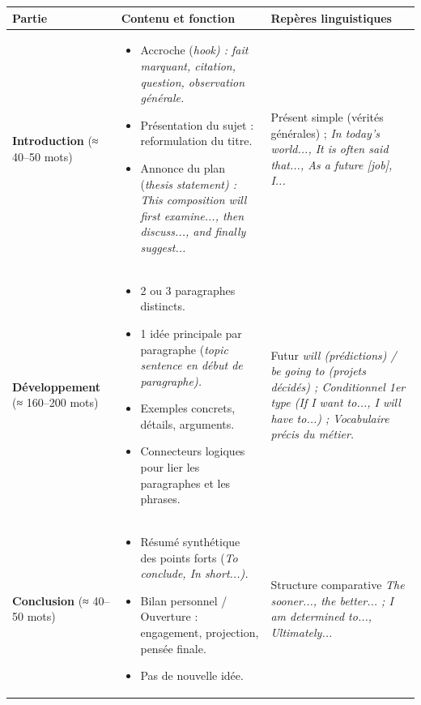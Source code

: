 \documentclass[11pt]{article}
\newcommand{\eng}[1]{\ifmmode\text{\textit{#1}}\else\begingroup\selectlanguage{english}\itshape #1\endgroup\fi}
\begin{document}
\begin{propriete}
\begin{center}
\begin{tabularx}{\linewidth}{|X|X|X|}
\hline
\rowcolor{popblueL} \textbf{Partie} & \textbf{Contenu et fonction} & \textbf{Repères linguistiques} \\
\hline
\textbf{Introduction} (≈ 40–50 mots) & \begin{itemize}\item Accroche (\eng{hook}) : fait marquant, citation, question, observation générale.\item Présentation du sujet : reformulation du titre.\item Annonce du plan (\eng{thesis statement}) : \eng{This composition will first examine..., then discuss..., and finally suggest...}\end{itemize} & Présent simple (vérités générales) ; \eng{In today's world...}, \eng{It is often said that...}, \eng{As a future [job], I...} \\
\hline
\textbf{Développement} (≈ 160–200 mots) & \begin{itemize}\item 2 ou 3 paragraphes distincts.\item 1 idée principale par paragraphe (\eng{topic sentence} en début de paragraphe).\item Exemples concrets, détails, arguments.\item Connecteurs logiques pour lier les paragraphes et les phrases.\end{itemize} & Futur \eng{will} (prédictions) / \eng{be going to} (projets décidés) ; Conditionnel 1er type (\eng{If I want to..., I will have to...}) ; Vocabulaire précis du métier. \\
\hline
\textbf{Conclusion} (≈ 40–50 mots) & \begin{itemize}\item Résumé synthétique des points forts (\eng{To conclude, In short...}).\item Bilan personnel / Ouverture : engagement, projection, pensée finale.\item Pas de nouvelle idée.\end{itemize} & Structure comparative \eng{The sooner..., the better...} ; \eng{I am determined to...}, \eng{Ultimately...} \\
\hline
\end{tabularx}
\end{center}
\end{propriete}
\end{document}
